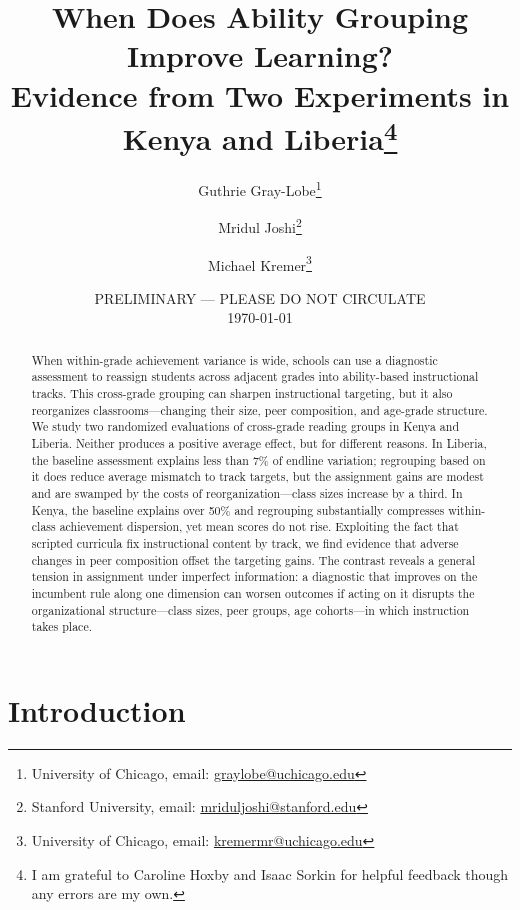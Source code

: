 \documentclass[11pt]{article}
\title{When Does Ability Grouping Improve Learning? \\ Evidence from Two Experiments in Kenya and Liberia\footnote{I am grateful to Caroline Hoxby and Isaac Sorkin for helpful feedback though any errors are my own. } }
\begin{document}
\begin{titlepage}
\author{Guthrie Gray-Lobe\thanks{University of Chicago, email: \protect\href{mailto:graylobe@uchicago.edu}{graylobe@uchicago.edu}} \and Mridul Joshi\thanks{Stanford University, email: \protect\href{mailto:mriduljoshi@stanford.edu}{mriduljoshi@stanford.edu}} \and Michael Kremer\thanks{University of Chicago, email: \protect\href{mailto:kremermr@uchicago.edu}{kremermr@uchicago.edu}}}

\date{PRELIMINARY --- PLEASE DO NOT CIRCULATE \\ \today}
\maketitle

\begin{abstract}\noindent
When within-grade achievement variance is wide, schools can use a diagnostic assessment to reassign students across adjacent grades into ability-based instructional tracks. This cross-grade grouping can sharpen instructional targeting, but it also reorganizes classrooms---changing their size, peer composition, and age-grade structure. We study two randomized evaluations of cross-grade reading groups in Kenya and Liberia. Neither produces a positive average effect, but for different reasons. In Liberia, the baseline assessment explains less than 7\% of endline variation; regrouping based on it does reduce average mismatch to track targets, but the assignment gains are modest and are swamped by the costs of reorganization---class sizes increase by a third. In Kenya, the baseline explains over 50\% and regrouping substantially compresses within-class achievement dispersion, yet mean scores do not rise. Exploiting the fact that scripted curricula fix instructional content by track, we find evidence that adverse changes in peer composition offset the targeting gains. The contrast reveals a general tension in assignment under imperfect information: a diagnostic that improves on the incumbent rule along one dimension can worsen outcomes if acting on it disrupts the organizational structure---class sizes, peer groups, age cohorts---in which instruction takes place.

\end{abstract}
\setcounter{page}{0}
\thispagestyle{empty}
\end{titlepage}
\doublespacing

\section{Introduction}
\label{sec:intro}
\end{document}
